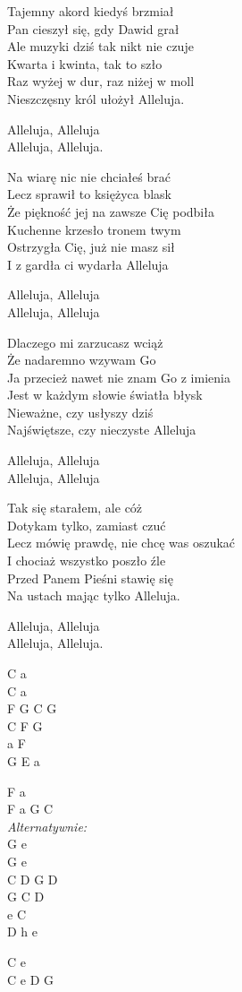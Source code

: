 \begin{text}
    Tajemny akord kiedyś brzmiał\\
    Pan cieszył się, gdy Dawid grał\\
    Ale muzyki dziś tak nikt nie czuje\\
    Kwarta i kwinta, tak to szło\\
    Raz wyżej w dur, raz niżej w moll\\
    Nieszczęsny król ułożył Alleluja.

    \vin Alleluja, Alleluja\\
    \vin Alleluja, Alleluja. 

    Na wiarę nic nie chciałeś brać\\
    Lecz sprawił to księżyca blask\\
    Że piękność jej na zawsze Cię podbiła\\
    Kuchenne krzesło tronem twym\\
    Ostrzygła Cię, już nie masz sił\\
    I z gardła ci wydarła Alleluja

    \vin Alleluja, Alleluja \\
    \vin Alleluja, Alleluja

    Dlaczego mi zarzucasz wciąż\\
    Że nadaremno wzywam Go\\
    Ja przecież nawet nie znam Go z imienia\\
    Jest w każdym słowie światła błysk\\
    Nieważne, czy usłyszy dziś\\
    Najświętsze, czy nieczyste Alleluja

    \vin Alleluja, Alleluja\\
    \vin Alleluja, Alleluja

    Tak się starałem, ale cóż\\
    Dotykam tylko, zamiast czuć \\
    Lecz mówię prawdę, nie chcę was oszukać\\
    I chociaż wszystko poszło źle\\
    Przed Panem Pieśni stawię się\\
    Na ustach mając tylko Alleluja.

    \vin Alleluja, Alleluja\\
    \vin Alleluja, Alleluja.

\end{text}
\begin{chord} 
    C a\\
    C a\\
    F G C G\\
    C F G\\
    a F\\
    G E a 

    F a\\
    F a G C\\
    \textit{Alternatywnie:}\\
    G e\\
    G e\\
    C D G D\\
    G C D\\
    e C\\
    D h e

    C e\\
    C e D G
\end{chord}